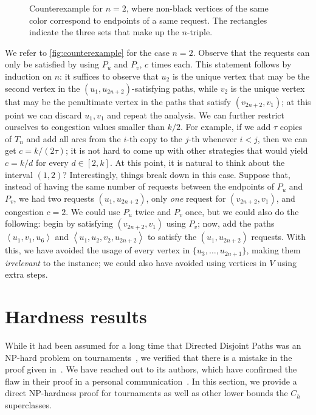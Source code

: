 \documentclass[a4paper,UKenglish,cleveref, autoref, thm-restate]{lipics-v2021}
\renewcommand{\NP}{{\sf NP}\xspace}
\newcommand{\angled}[1]{\left\langle{#1}\right\rangle}
\newcommand{\pname}[1]{{\sc #1}}
\newcommand{\congestion}{c}
\begin{document}
\begin{figure}[!htb]
  \caption{Counterexample for $n = 2$, where non-black vertices of the same color correspond to endpoints of a same request. The rectangles indicate the three sets that make up the $n$-triple.\label{fig:counterexample}}
\end{figure}

We refer to \autoref{fig:counterexample} for the case $n = 2$. Observe that the requests can only be satisfied by using $P_u$ and $P_v$, $c$ times each. This statement follows by induction on $n$: it suffices to observe that $u_2$ is the unique vertex that may be the second vertex in the $(u_1, u_{2n+2})$-satisfying paths, while $v_2$ is the unique vertex that may be the penultimate vertex in the paths that satisfy $(v_{2n+2}, v_1)$; at this point we can discard $u_1, v_1$ and repeat the analysis.
We can further restrict ourselves to congestion values smaller than $k/2$. For example, if we add $\tau$ copies of $T_n$ and add all arcs from the $i$-th copy to the $j$-th whenever $i < j$, then we can get $\congestion = k/(2\tau)$; it is not hard to come up with other strategies that would yield $\congestion = k/d$ for every $d \in [2, k]$.
At this point, it is natural to think about the interval $(1, 2)$? Interestingly, things break down in this case.
Suppose that, instead of having the same number of requests between the endpoints of $P_u$ and $P_v$, we had two requests $(u_1, u_{2n+2})$, only \textit{one} request for $(v_{2n+2}, v_1)$, and congestion $\congestion = 2$. We could use $P_u$ twice and $P_v$ once, but we could also do the following: begin by satisfying $(v_{2n+2}, v_1)$ using $P_v$; now, add the paths $\angled{u_1, v_1, u_6}$ and $\angled{u_1, u_2, v_2, u_{2n+2}}$ to satisfy the $(u_1, u_{2n+2})$ requests. With this, we have avoided the usage of every vertex in $\{u_3, \dots, u_{2n+1}\}$, making them \textit{irrelevant} to the instance; we could also have avoided using vertices in $V$ using extra steps.  \section{Hardness results}
\label{sec:hardnesses}

  While it had been assumed for a long time that \pname{Directed Disjoint Paths} was an \NP-hard problem on tournaments~\cite{chudnovsky_union_of_tournaments,Slivkins2010,KawarabayashiKK14,Amiri2019}, we verified that there is a mistake in the proof given
  in~\cite{thomassen_tournament_nph}. We have reached out to its authors, which have confirmed the flaw in their proof in a
  personal communication~\cite{personal-communication}.
  In this section, we provide a direct \NP-hardness proof for tournaments as well as other lower bounds the $C_h$ superclasses.
\end{document}
